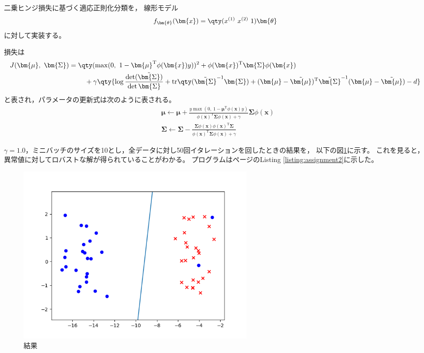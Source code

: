 \documentclass[class=jsarticle, crop=false, dvipdfmx, fleqn]{standalone}
\begin{document}
\section{}

二乗ヒンジ損失に基づく適応正則化分類を，
線形モデル
\begin{equation}
    f_{\bm{\theta}} (\bm{x}) = \qty(x^{(1)}\ x^{(2)}\ 1) \bm{\theta}
\end{equation}
に対して実装する。

損失は
\begin{align}
    J(\bm{\mu},\ \bm{\Sigma})
        & = \qty(\max(0,\ 1 - \bm{\mu}^\mathrm{T} \phi(\bm{x}) y))^2
            + \phi(\bm{x})^\mathrm{T} \bm{\Sigma} \phi(\bm{x})
            \notag \\
        & \ \qquad
            + \gamma \qty{
            \log\frac{\det(\tilde{\bm{\Sigma}})}{\det{\bm{\Sigma}}}
            + \mathrm{tr}\qty(\tilde{\bm{\Sigma}}^{-1} \bm{\Sigma})
            + (\bm{\mu} - \tilde{\bm{\mu}})^\mathrm{T} \tilde{\bm{\Sigma}}^{-1} (\bm{\mu} - \tilde{\bm{\mu}})
            - d
            }
    \label{eq:loss}
\end{align}
と表され，パラメータの更新式は次のように表される。
\begin{align}
    & \bm{\mu} \leftarrow \bm{\mu} + \frac{y \max(0,\ 1 - \bm{\mu}^\mathrm{T} \phi(\bm{x}) y)}{\phi(\bm{x})^\mathrm{T} \bm{\Sigma} \phi(\bm{x}) + \gamma} \bm{\Sigma} \phi(\bm{x}) \\
    & \bm{\Sigma} \leftarrow \bm{\Sigma} - \frac{\bm{\Sigma} \phi(\bm{x}) \phi(\bm{x})^\mathrm{T} \bm{\Sigma}}{\phi(\bm{x})^\mathrm{T} \bm{\Sigma} \phi(\bm{x}) + \gamma}
\end{align}

\(\gamma = 1.0\)，ミニバッチのサイズを10とし，全データに対し50回イタレーションを回したときの結果を，
以下の図\ref{fig:result}に示す。
これを見ると，異常値に対してロバストな解が得られていることがわかる。
プログラムは\pageref{listing:assignment2}ページのListing \ref{listing:assignment2}に示した。

\begin{figure}[H]
    \centering
    \includegraphics[clip, width=12cm]{../figures/assignment2_result}
    \caption{結果}
    \label{fig:result}
\end{figure}
\end{document}

